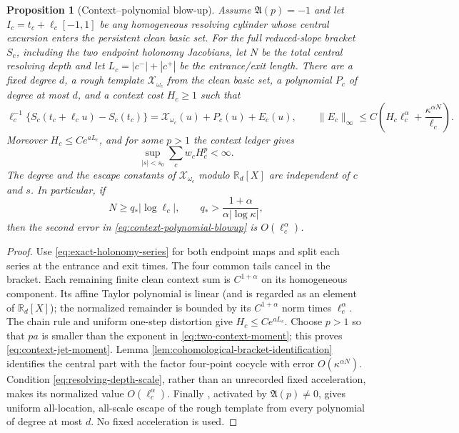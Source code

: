 \documentclass[11pt]{article}
\newtheorem{proposition}[theorem]{Proposition}
\begin{document}
\begin{proposition}[Context--polynomial blow-up]
\label{prop:context-polynomial-blowup}
Assume $\mathfrak A(p)=-1$ and let $I_c=t_c+\ell_c[-1,1]$ be any homogeneous
resolving cylinder whose central excursion enters the persistent clean basic
set.  For the full reduced-slope bracket $S_c$, including the two endpoint
holonomy Jacobians, let $N$ be the total central resolving depth and let
$L_c=|c^-|+|c^+|$ be the entrance/exit length.  There are a fixed degree $d$,
a rough template $\mathcal X_{\omega_c}$ from the clean basic set, a
polynomial $P_c$ of degree at most $d$, and a context cost $H_c\ge1$ such that
\begin{equation}
\label{eq:context-polynomial-blowup}
 \ell_c^{-1}\{S_c(t_c+\ell_c u)-S_c(t_c)\}
 =\mathcal X_{\omega_c}(u)+P_c(u)+E_c(u),\qquad
 \|E_c\|_\infty\le C\left(H_c\ell_c^\alpha+
       \frac{\kappa^{\alpha N}}{\ell_c}\right).
\end{equation}
Moreover $H_c\le Ce^{aL_c}$, and for some $p>1$ the context ledger gives
\begin{equation}
\label{eq:context-jet-moment}
 \sup_{|s|<s_0}\sum_c w_c H_c^p<\infty .
\end{equation}
The degree and the escape constants of $\mathcal X_{\omega_c}$ modulo
$\mathbb R_d[X]$ are independent of $c$ and $s$.  In particular, if
\begin{equation}
\label{eq:resolving-depth-scale}
 N\ge q_*|\log\ell_c|,
 \qquad q_*>\frac{1+\alpha}{\alpha|\log\kappa|},
\end{equation}
then the second error in \eqref{eq:context-polynomial-blowup} is
$O(\ell_c^\alpha)$.
\end{proposition}

\begin{proof}
Use \eqref{eq:exact-holonomy-series} for both endpoint maps and split each
series at the entrance and exit times.  The four common tails cancel in the
bracket.  Each remaining finite clean context sum is $C^{1+\alpha}$ on its
homogeneous component.  Its affine Taylor polynomial is linear (and is
regarded as an element of $\mathbb R_d[X]$); the normalized remainder is
bounded by its $C^{1+\alpha}$ norm times $\ell_c^\alpha$.  The chain rule and
uniform one-step distortion give $H_c\le Ce^{aL_c}$.  Choose $p>1$ so that
$pa$ is smaller than the exponent in \eqref{eq:two-context-moment}; this proves
\eqref{eq:context-jet-moment}.  Lemma
\ref{lem:cohomological-bracket-identification} identifies the central part
with the factor four-point cocycle with error $O(\kappa^{\alpha N})$.
Condition \eqref{eq:resolving-depth-scale}, rather than an unrecorded fixed
acceleration, makes its normalized value $O(\ell_c^\alpha)$.  Finally
\cite[Propositions~4.31--4.32]{Leclerc2026}, activated by
$\mathfrak A(p)\ne0$, gives uniform all-location, all-scale escape of the rough
template from every polynomial of degree at most $d$.  No fixed acceleration
is used.
\end{proof}
\end{document}
